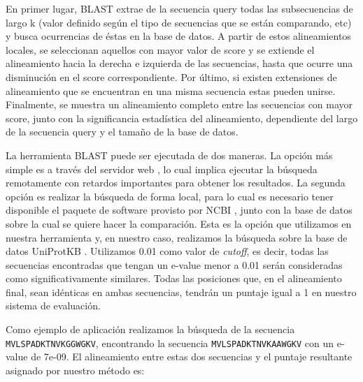 En primer lugar, BLAST extrae de la secuencia query todas las subsecuencias de largo k (valor definido según el tipo de secuencias que se están comparando, etc) y busca ocurrencias de éstas en la base de datos.
A partir de estos alineamientos locales, se seleccionan aquellos con mayor valor de score y se extiende el alineamiento hacia la derecha e izquierda de las secuencias, 
hasta que ocurre una disminución en el score correspondiente.
Por último, si existen extensiones de alineamiento que se encuentran en una misma secuencia estas pueden unirse.
Finalmente, se muestra un alineamiento completo entre las secuencias con mayor score, junto con 
la significancia estadística del alineamiento, dependiente del largo de la secuencia query y el tamaño de la base de datos.




La herramienta BLAST puede ser ejecutada de dos maneras. La opción más simple es a través del servidor web \cite{blastWeb}, lo cual implica ejecutar la búsqueda remotamente con retardos importantes para obtener los resultados. 
La segunda opción es realizar la búsqueda de forma local, para lo cual es necesario tener disponible el paquete de software provisto por NCBI \cite{blastLocal}, junto con la base de datos sobre la cual se quiere hacer la comparación.
Esta es la opción que utilizamos en nuestra herramienta y, en nuestro caso, realizamos la búsqueda sobre la base de datos UniProtKB \cite{bairoch2000swiss}.
Utilizamos 0.01 como valor de \textit{cutoff}, es decir, todas las secuencias encontradas que tengan un e-value menor a 0.01 serán consideradas como significativamente similares.
Todas las posiciones que, en el alineamiento final, sean idénticas en ambas secuencias, tendrán un puntaje igual a 1 en nuestro sistema de evaluación.

Como ejemplo de aplicación realizamos la búsqueda de la secuencia \texttt{MVLSPADKTNVKGGWGKV}, encontrando la secuencia \texttt{MVLSPADKTNVKAAWGKV} con un e-value de 7e-09. 
El alineamiento entre estas dos secuencias y el puntaje resultante asignado por nuestro método es:
\vspace{0.5cm}

